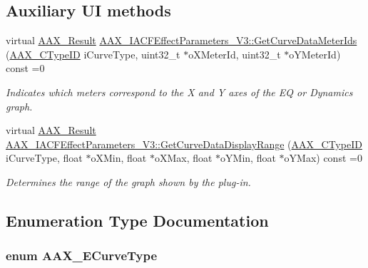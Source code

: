 \subsection*{Auxiliary U\+I methods}
\begin{DoxyCompactItemize}
\item 
virtual \hyperlink{a00149_a4d8f69a697df7f70c3a8e9b8ee130d2f}{A\+A\+X\+\_\+\+Result} \hyperlink{a00342_gac7ba3c1063c35d761fdeba9c9a6cc0d1}{A\+A\+X\+\_\+\+I\+A\+C\+F\+Effect\+Parameters\+\_\+\+V3\+::\+Get\+Curve\+Data\+Meter\+Ids} (\hyperlink{a00149_ac678f9c1fbcc26315d209f71a147a175}{A\+A\+X\+\_\+\+C\+Type\+I\+D} i\+Curve\+Type, uint32\+\_\+t $\ast$o\+X\+Meter\+Id, uint32\+\_\+t $\ast$o\+Y\+Meter\+Id) const =0
\begin{DoxyCompactList}\small\item\em Indicates which meters correspond to the X and Y axes of the E\+Q or Dynamics graph. \end{DoxyCompactList}\item 
virtual \hyperlink{a00149_a4d8f69a697df7f70c3a8e9b8ee130d2f}{A\+A\+X\+\_\+\+Result} \hyperlink{a00342_ga38d1ac0c15a7052904077ef0e2527e0d}{A\+A\+X\+\_\+\+I\+A\+C\+F\+Effect\+Parameters\+\_\+\+V3\+::\+Get\+Curve\+Data\+Display\+Range} (\hyperlink{a00149_ac678f9c1fbcc26315d209f71a147a175}{A\+A\+X\+\_\+\+C\+Type\+I\+D} i\+Curve\+Type, float $\ast$o\+X\+Min, float $\ast$o\+X\+Max, float $\ast$o\+Y\+Min, float $\ast$o\+Y\+Max) const =0
\begin{DoxyCompactList}\small\item\em Determines the range of the graph shown by the plug-\/in. \end{DoxyCompactList}\end{DoxyCompactItemize}


\subsection{Enumeration Type Documentation}
\hypertarget{a00342_ga59c73d8f51c5c55d54a728eff39da884}{}
\subsubsection[{A\+A\+X\+\_\+\+E\+Curve\+Type}]{\setlength{\rightskip}{0pt plus 5cm}enum {\bf A\+A\+X\+\_\+\+E\+Curve\+Type}}\label{a00342_ga59c73d8f51c5c55d54a728eff39da884}


